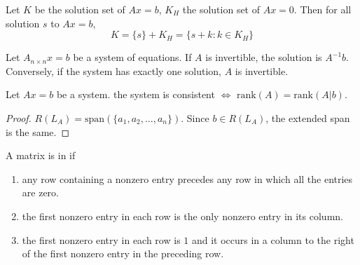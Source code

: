 \begin{theorem}
	Let $K$ be the solution set of $Ax=b$, $K_H$ the solution set of $Ax=0$. Then for all solution $s$ to $Ax=b$,
	\begin{equation}
		K = \{ s \} + K_H = \{s+k: k \in K_H \}
	\end{equation}
\end{theorem}


\begin{theorem}
	Let $A_{n \times n}x=b$ be a system of equations. If $A$ is invertible, the solution is $A^{-1}b$. Conversely, if the system has exactly one solution, $A$ is invertible.
\end{theorem}



\begin{theorem}
	Let $Ax=b$ be a system. the system is consistent $\Leftrightarrow$ $\text{rank}(A) = \text{rank}(A|b)$.
\end{theorem}

\begin{proof}
    $R(L_A) = \text{span}(\{a_1, a_2, \dots, a_n \})$. Since $b \in R(L_A)$, the extended span is the same.
\end{proof}


\begin{definition}
	A matrix is in  if 
	\begin{enumerate}
		\item any row containing a nonzero entry precedes any row in which all the entries are zero.
		\item the first nonzero entry in each row is the only nonzero entry in its column.
		\item the first nonzero entry in each row is $1$ and it occurs in a column to the right of the first nonzero entry in the preceding row.
	\end{enumerate}
\end{definition}






